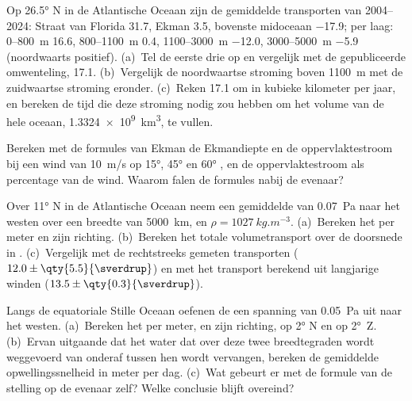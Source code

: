 \begin{exercise}[$\star$]\label{exo:b1:ocean-circulation:3}
Op \ang{26.5} N in de Atlantische Oceaan zijn de gemiddelde transporten van 2004--2024: Straat van
Florida \qty{31.7}{\sverdrup}, Ekman \qty{3.5}{\sverdrup}, bovenste midoceaan
\qty{-17.9}{\sverdrup}; per laag: 0--\qty{800}{m} \qty{16.6}{\sverdrup},
800--\qty{1100}{m} \qty{0.4}{\sverdrup}, 1100--\qty{3000}{m} \qty{-12.0}{\sverdrup},
3000--\qty{5000}{m} \qty{-5.9}{\sverdrup} (noordwaarts positief). (a)~Tel de eerste drie op en vergelijk met de gepubliceerde omwenteling, \qty{17.1}{\sverdrup}. (b)~Vergelijk de noordwaartse stroming boven \qty{1100}{m} met de zuidwaartse stroming eronder. (c)~Reken \qty{17.1}{\sverdrup} om in kubieke kilometer per jaar, en bereken de tijd die deze stroming nodig zou hebben om het volume van de hele oceaan, \qty{1.3324e9}{km^3}, te vullen.
\end{exercise}

\begin{exercise}[$\star$]\label{exo:b1:ocean-circulation:4}
Bereken met de formules van Ekman de Ekmandiepte en de oppervlaktestroom bij een wind van
\qty{10}{m/s} op \ang{15}, \ang{45} en \ang{60} , en de oppervlaktestroom als percentage van de wind. Waarom falen de formules nabij de evenaar?
\end{exercise}

\begin{exercise}[$\star\star$]\label{exo:b1:ocean-circulation:5}
Over \ang{11} N in de Atlantische Oceaan neem een gemiddelde  van \qty{0.07}{Pa} naar het
westen over een breedte van \qty{5000}{km}, en $\rho = \qty{1027}{kg.m^{-3}}$.
(a)~Bereken het  per meter en zijn richting. (b)~Bereken het totale volumetransport over de doorsnede in . (c)~Vergelijk met de rechtstreeks gemeten
transporten ($12.0 \pm \qty{5.5}{\sverdrup}$) en met het transport berekend uit langjarige
winden ($13.5 \pm \qty{0.3}{\sverdrup}$).
\end{exercise}

\begin{exercise}[$\star\star$]\label{exo:b1:ocean-circulation:6}
Langs de equatoriale Stille Oceaan oefenen de  een spanning van \qty{0.05}{Pa} uit
naar het westen. (a)~Bereken het  per meter, en zijn richting, op \ang{2} N en op \ang{2}~Z. (b)~Ervan uitgaande dat het water dat over deze twee breedtegraden wordt weggevoerd van onderaf tussen hen wordt vervangen, bereken de gemiddelde opwellingssnelheid in meter per dag. (c)~Wat gebeurt er met de formule van de stelling op de evenaar zelf? Welke conclusie blijft overeind?
\end{exercise}

